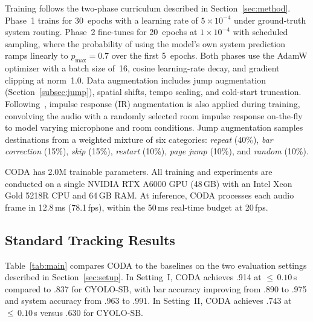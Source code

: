 Training follows the two-phase curriculum described in
Section~\ref{sec:method}. Phase~1 trains for 30~epochs with a learning rate of
$5{\times}10^{-4}$ under ground-truth system routing. Phase~2 fine-tunes for
20~epochs at $1{\times}10^{-4}$ with scheduled sampling, where the probability of using the model's own system prediction ramps linearly to $p_{\max}{=}0.7$ over the first 5~epochs. Both phases use the AdamW optimizer with a batch size of~16, cosine learning-rate decay, and gradient clipping at
norm~1.0. Data augmentation includes jump augmentation (Section~\ref{subsec:jump}), spatial shifts, tempo scaling, and cold-start truncation. Following~\cite{henkel2021real}, impulse response (IR) augmentation is also applied during training, convolving the audio with a randomly selected room impulse response on-the-fly to model varying microphone and room conditions. Jump augmentation samples destinations from a weighted mixture of six categories: \emph{repeat} (40\%), \emph{bar correction} (15\%), \emph{skip} (15\%), \emph{restart} (10\%), \emph{page jump} (10\%), and \emph{random} (10\%).
 
CODA has 2.0M trainable parameters. All training and experiments are conducted on a single NVIDIA RTX A6000 GPU (48\,GB) with an Intel Xeon Gold 5218R CPU and 64\,GB RAM. At inference, CODA processes each audio frame in 12.8\,ms (78.1\,fps), within the 50\,ms real-time budget at 20\,fps.

\subsection{Standard Tracking Results}\label{sec:tracking}
 
Table~\ref{tab:main} compares CODA to the baselines on the two evaluation
settings described in Section~\ref{sec:setup}. In Setting~I, CODA achieves .914 at ${\leq}\,0.10$\,s compared to .837 for CYOLO-SB, with bar accuracy improving from .890 to .975 and system accuracy from .963 to .991. In Setting~II, CODA achieves .743 at ${\leq}\,0.10$\,s versus .630 for CYOLO-SB.


